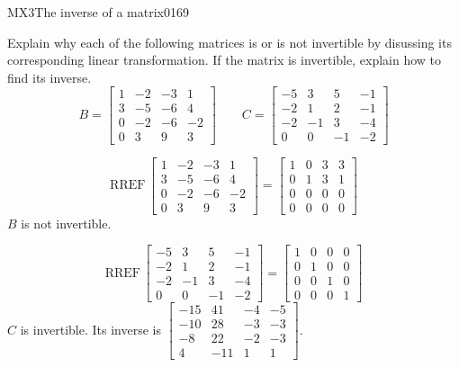 \begin{exercise}{MX3}{The inverse of a matrix}{0169} 
\begin{exerciseStatement} 

 Explain why each of the following matrices is or is not invertible by disussing its corresponding linear transformation. If the matrix is invertible, explain how to find its inverse. \[
\hspace{2em}
B = \left[\begin{array}{cccc}
1 & -2 & -3 & 1 \\
3 & -5 & -6 & 4 \\
0 & -2 & -6 & -2 \\
0 & 3 & 9 & 3
\end{array}\right]
\hspace{2em}
C = \left[\begin{array}{cccc}
-5 & 3 & 5 & -1 \\
-2 & 1 & 2 & -1 \\
-2 & -1 & 3 & -4 \\
0 & 0 & -1 & -2
\end{array}\right]
\hspace{2em}
        \] 

 \end{exerciseStatement}
 \begin{exerciseAnswer} 

 \[\mathrm{RREF}\,\left[\begin{array}{cccc}
1 & -2 & -3 & 1 \\
3 & -5 & -6 & 4 \\
0 & -2 & -6 & -2 \\
0 & 3 & 9 & 3
\end{array}\right]=\left[\begin{array}{cccc}
1 & 0 & 3 & 3 \\
0 & 1 & 3 & 1 \\
0 & 0 & 0 & 0 \\
0 & 0 & 0 & 0
\end{array}\right]\] \(B\) is not invertible. 

 

 \[\mathrm{RREF}\,\left[\begin{array}{cccc}
-5 & 3 & 5 & -1 \\
-2 & 1 & 2 & -1 \\
-2 & -1 & 3 & -4 \\
0 & 0 & -1 & -2
\end{array}\right]=\left[\begin{array}{cccc}
1 & 0 & 0 & 0 \\
0 & 1 & 0 & 0 \\
0 & 0 & 1 & 0 \\
0 & 0 & 0 & 1
\end{array}\right]\] \(C\) is invertible. Its inverse is \(\left[\begin{array}{cccc}
-15 & 41 & -4 & -5 \\
-10 & 28 & -3 & -3 \\
-8 & 22 & -2 & -3 \\
4 & -11 & 1 & 1
\end{array}\right]\). 

 \end{exerciseAnswer}
 \end{exercise}
